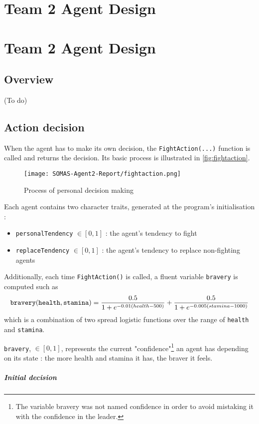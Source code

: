 \chapter{Team 2 Agent Design}\label{team_2_agent_design}\chapter{Team 2 Agent Design}\label{team_2_agent_design}

\section{Overview}
(To do)

\section{Action decision}
When the agent has to make its own decision, the \verb|FightAction(...)| function is called and returns the decision. Its basic process is illustrated in \autoref{fig:fightaction}.

\begin{figure}[h!]
    \centering
    \texttt{[image: SOMAS-Agent2-Report/fightaction.png]}
    \caption{Process of personal decision making}
    \label{fig:fightaction}
\end{figure}

Each agent contains two character traits, generated at the program's initialisation : \begin{itemize}
    \item \verb|personalTendency| $\in[0,1]$ : the agent's tendency to fight
    \item \verb|replaceTendency| $\in[0,1]$ : the agent's tendency to replace non-fighting agents
\end{itemize}
Additionally, each time \verb|FightAction()| is called, a fluent variable \verb|bravery| is computed such as $$\verb|bravery|(\verb|health|, \verb|stamina|) = \frac{0.5}{1+e^{-0.01(health-500)}} + \frac{0.5}{1+e^{-0.005(stamina-1000)}}$$
which is a combination of two spread logistic functions over the range of \verb|health| and \verb|stamina|.

 \verb|bravery|, $\in [0,1]$, represents the current "confidence"\footnote{The variable bravery was not named confidence in order to avoid mistaking it with the confidence in the leader.} an agent has depending on its state : the more health and stamina it has, the braver it feels.

 \paragraph{Initial decision}

